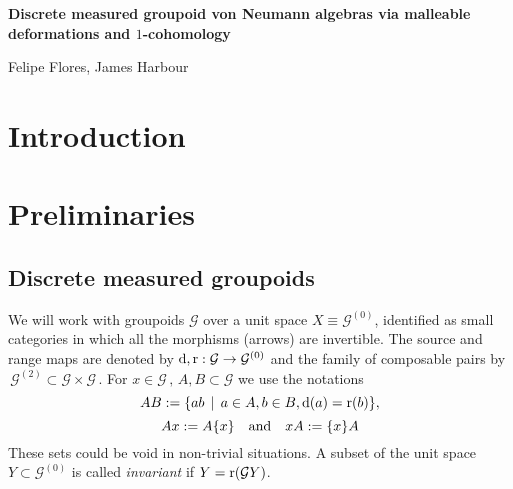 \documentclass[a4paper,11pt]{article}
\numberwithin{equation}{section}
\theoremstyle{definition}
\theoremstyle{remark}
\numberwithin{equation}{section}
\newcommand{\rG}{\mathcal{G}}
\def\r{{\rm r}}
\def\d{{\rm d}}
\numberwithin{equation}{section}
\begin{document}
\begin{center}
{\boldmath\LARGE\bf Discrete measured groupoid von Neumann algebras via malleable deformations and $1$-cohomology}


\vspace{1ex}

{\sc Felipe Flores, James Harbour}


\end{center}

\vspace{2ex}

\begin{abstract}\setlength{\parindent}{0pt}\setlength{\parskip}{1ex}\noindent

Given a probability measure preserving groupoid $\mathcal{G}$, we study properties of the corresponding von Neumann algebra $L(\mathcal{G})$ using the techniques of deformation-rigidity theory. Building on work of Sinclair and Hoff, we extend the Gaussian construction for equivalence relations to general measured groupoids. Using Popa's spectral gap argument, we then obtain structural properties about $L(\mathcal{G})$ including primeness and lack of property $(\Gamma)$. We also generalize results of de Santiago, Hayes, Hoff, and Sinclair to characterize maximal rigid subalgebras of $L(\mathcal{G})$ in terms of the corresponding groupoid $L^2$-cohomology.

\end{abstract}

\section{Introduction}



\section{Preliminaries}
\label{preliminaries section}

\subsection{Discrete measured groupoids}\label{meas-group}

We will work with groupoids $\rG$ over a unit space $X\equiv\rG^{(0)}$, identified as small categories in which all the morphisms (arrows) are invertible. 
The source and range maps are denoted by ${\rm d,r}:\rG\to \rG^{(0)}$ and the family of composable pairs by $\,\rG^{(2)}\!\subset\rG\times\rG$\,.  For $x\in\rG\,,\,A, B\subset\rG$ we use the notations
\begin{equation}\label{botations}
AB:=\{ab\,\mid\,a\in A,b\in B,\d(a)=\r(b)\},
\end{equation}
\begin{equation}\label{ottations}
Ax:= A\{x\}\quad \textup{and}\quad xA:=\{x\}A
\end{equation}
These sets could be void in non-trivial situations. A subset of the unit space $Y \subset \rG^{(0)}$ is called {\it invariant} if $Y=\r(\rG Y)$. 
\end{document}
